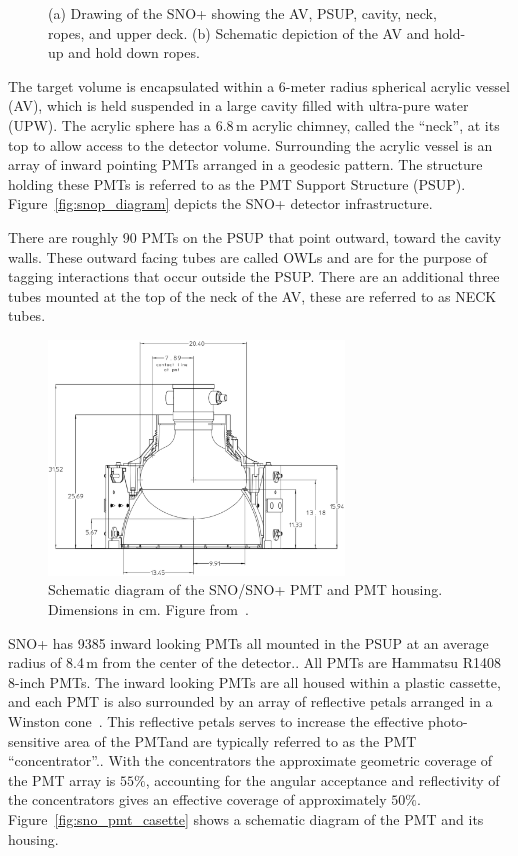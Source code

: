 \begin{figure}[htbp]
\label{fig:snop_diagrams}
    \caption[SNO+ Detector]{(a) Drawing of the SNO+ showing the
    AV, PSUP, cavity, neck, ropes, and upper deck. (b) Schematic
    depiction of the AV and hold-up and hold down ropes.}
\end{figure}

The target volume is encapsulated within a 6-meter radius spherical acrylic vessel (AV),
which is held suspended in a large cavity filled with ultra-pure water (UPW)\@.
The acrylic sphere has a 6.8\,m acrylic chimney, called the ``neck'', at its top
to allow access to the detector volume.
Surrounding the acrylic vessel is an  array of inward pointing PMTs
arranged in a geodesic pattern.
The structure holding these PMTs is referred to as the PMT Support Structure
(PSUP).
Figure~\ref{fig:snop_diagram} depicts the SNO+ detector infrastructure.

There are roughly 90 PMTs on the PSUP that point outward, toward the cavity
walls.
These outward facing tubes are called OWLs and are for the purpose of tagging
interactions that occur outside the PSUP\@.
There are an additional three tubes mounted at the top of the neck of the AV,
these are referred to as NECK tubes.


\begin{figure}[htbp]
    \centering
    \includegraphics[width=0.7\textwidth]{sno_casette}
    \caption[PMT Casette] {Schematic diagram of the SNO/SNO+ PMT and
    PMT housing. Dimensions in cm. Figure from~\citep{sno_detector_paper}.}
\label{fig:triggeff}
\end{figure}

SNO+ has 9385 inward looking PMTs all mounted in the PSUP at an average radius
of 8.4\,m from the center of the detector..
All PMTs are Hammatsu R1408 8-inch PMTs.
The inward looking PMTs are all housed within a plastic cassette,
and each PMT is also surrounded by an array of reflective
petals arranged in a Winston cone~\cite{winston}.
This reflective petals serves to increase the effective photo-sensitive area
of the PMT\@ and are typically referred to as the PMT ``concentrator''..
With the concentrators the approximate geometric coverage of the PMT array is $55\%$,
accounting for the angular acceptance and reflectivity of the concentrators gives
an effective coverage of approximately $50\%$.
Figure~\ref{fig:sno_pmt_casette} shows a schematic diagram of the PMT and
its housing.


